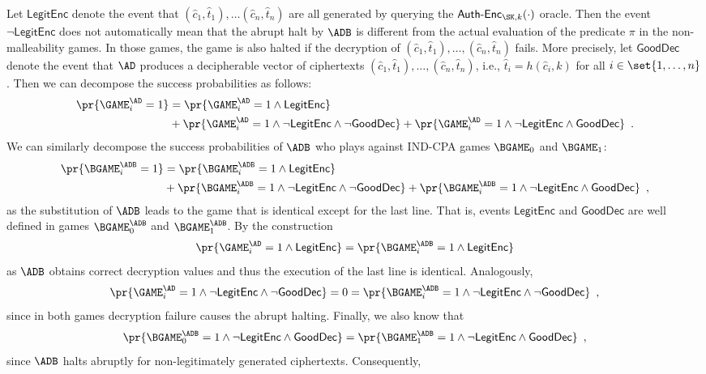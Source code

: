 \documentclass{crypto-exercise}
\newcommand{\AENC}{\mathsf{Auth\text{-}Enc}}
\newcommand{\LENC}{\mathsf{LegitEnc}}
\newcommand{\GDEC}{\mathsf{GoodDec}}
\begin{document}
\begin{solution}
Let $\LENC$ denote the  event that  $(\hat{c}_1,\hat{t}_1),\ldots(\hat{c}_n,\hat{t}_n)$ are all generated by querying the $\AENC_{\SK,k}(\cdot)$ oracle. Then the event $\neg\LENC$ does not automatically mean that the abrupt halt by $\ADB$ is different from the actual evaluation of the predicate $\pi$ in the non-malleability games. In those games, the game is also halted if the decryption of $(\hat{c}_1,\hat{t}_1),\ldots,(\hat{c}_n,\hat{t}_n)$ fails. More precisely, let $\GDEC$ denote the event that $\AD$ produces a decipherable vector of ciphertexts $(\hat{c}_1,\hat{t}_1),\ldots,(\hat{c}_n,\hat{t}_n)$, i.e., $\hat{t}_i=h(\hat{c}_i,k)$ for all $i\in\set{1,\ldots,n}$. Then
we can decompose the success probabilities as follows:
\begin{align*}
\pr{\GAME_i^\AD=1}&=\pr{\GAME_i^\AD=1\wedge\LENC}\\
&+
\pr{\GAME_i^\AD=1\wedge\neg\LENC\wedge\neg\GDEC}+
\pr{\GAME_i^\AD=1\wedge\neg\LENC\wedge\GDEC}\enspace.
\end{align*} 
We can similarly decompose the success probabilities of $\ADB$ who plays against IND-CPA games $\BGAME_0$ and $\BGAME_1$:
\begin{align*}
\pr{\BGAME_i^\ADB=1}&=\pr{\BGAME_i^\ADB=1\wedge\LENC}\\
&+
\pr{\BGAME_i^\ADB=1\wedge\neg\LENC\wedge\neg\GDEC}+
\pr{\BGAME_i^\ADB=1\wedge\neg\LENC\wedge\GDEC}\enspace,
\end{align*} 
as the substitution of $\ADB$ leads to the game that is identical except for the last line. That is, events $\LENC$ and $\GDEC$ are well defined in games $\BGAME_0^\ADB$ and $\BGAME_1^\ADB$. By the construction
\begin{align*}
\pr{\GAME_i^\AD=1\wedge\LENC}=\pr{\BGAME_i^\ADB=1\wedge\LENC}
\end{align*} 
as $\ADB$ obtains correct decryption values and thus the execution of the last line is identical. Analogously, 
\begin{align*}
\pr{\GAME_i^\AD=1\wedge\neg\LENC\wedge\neg\GDEC}= 0 =
\pr{\BGAME_i^\ADB=1\wedge\neg\LENC\wedge\neg\GDEC}\enspace, 
\end{align*}
since in both games decryption failure causes the abrupt halting. Finally, we also know that   
\begin{align*}
\pr{\BGAME_0^\ADB=1\wedge\neg\LENC\wedge\GDEC}=\pr{\BGAME_1^\ADB=1\wedge\neg\LENC\wedge\GDEC}\enspace, 
\end{align*}
since $\ADB$ halts abruptly for non-legitimately generated ciphertexts. Consequently,
\begin{align*}

\end{align*}
\end{solution}
\end{document}
